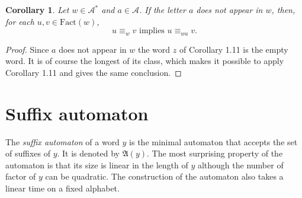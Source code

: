 \documentclass[11pt]{report}
\newtheorem{corollary}[theorem]{Corollary}
\begin{document}
\begin{corollary}
  Let $w \in \mathcal{A}^*$ and $a \in \mathcal{A}$. If the letter $a$
  does not appear in $w$, then, for each $u, v \in
  \text{Fact}(w)$, $$u \equiv_w v \text{ implies } u \equiv_{wa} v.$$
\end{corollary}
\begin{proof}
  Since $a$ does not appear in $w$ the word $z$ of Corollary 1.11 is
  the empty word. It is of course the longest of its class, which
  makes it possible to apply Corollary 1.11 and gives the same conclusion.
\end{proof}
\chapter{Suffix automaton}
The \textit{suffix automaton} of a word $y$ is the minimal automaton
that accepts the set of suffixes of $y$. It is denoted by
$\mathfrak{A}(y)$. The most surprising property of the automaton is
that its size is linear in the length of $y$ although the number of
factor of $y$ can be quadratic. The construction of the automaton also
takes a linear time on a fixed alphabet.
\end{document}
